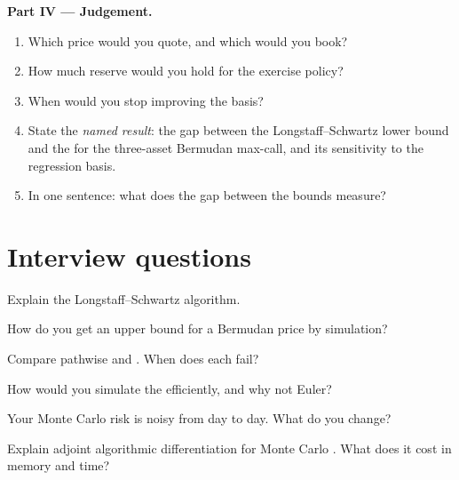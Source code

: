 \begin{problem}
\medskip\noindent\textbf{Part IV --- Judgement.}
\begin{enumerate}[resume]
\item Which price would you quote, and which would you book?
\item How much reserve would you hold for the exercise policy?
\item When would you stop improving the basis?
\item State the \emph{named result}: the gap between the Longstaff--Schwartz lower bound and the  for the three-asset Bermudan max-call, and its
sensitivity to the regression basis.
\item In one sentence: what does the gap between the bounds measure?
\end{enumerate}
\end{problem}

\section{Interview questions}

\begin{interviewq}\label{iq:dv:monte-carlo-pricers-in-practice:1}
Explain the Longstaff--Schwartz algorithm.
\end{interviewq}

\begin{interviewq}\label{iq:dv:monte-carlo-pricers-in-practice:2}
How do you get an upper bound for a Bermudan price by simulation?
\end{interviewq}

\begin{interviewq}\label{iq:dv:monte-carlo-pricers-in-practice:3}
Compare pathwise and . When does each fail?
\end{interviewq}

\begin{interviewq}\label{iq:dv:monte-carlo-pricers-in-practice:4}
How would you simulate the  efficiently, and why not Euler?
\end{interviewq}

\begin{interviewq}\label{iq:dv:monte-carlo-pricers-in-practice:5}
Your Monte Carlo risk is noisy from day to day. What do you change?
\end{interviewq}

\begin{interviewq}\label{iq:dv:monte-carlo-pricers-in-practice:6}
Explain adjoint algorithmic differentiation for Monte Carlo . What does it cost in memory and time?
\end{interviewq}
